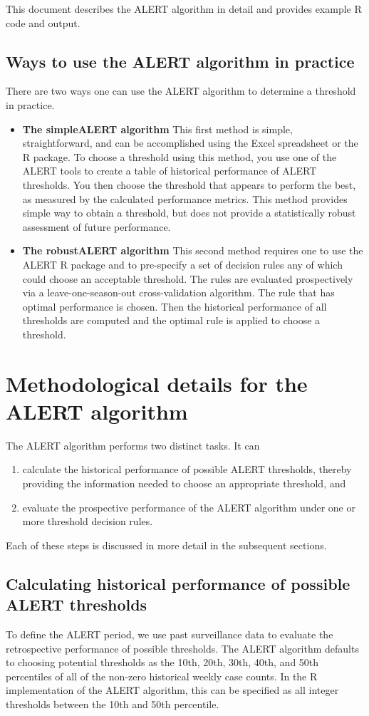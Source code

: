\documentclass[11pt]{article}\usepackage[]{graphicx}\usepackage[]{color}
\begin{document}
This document describes the ALERT algorithm in detail and provides example R code and output. 

\subsection*{Ways to use the ALERT algorithm in practice}
There are two ways one can use the ALERT algorithm to determine a threshold in practice. 

\begin{itemize}
\item {\bf The simpleALERT algorithm} This first method is simple, straightforward, and can be accomplished using the Excel spreadsheet or the R package. To choose a threshold using this method, you use one of the ALERT tools to create a table of historical performance of ALERT thresholds. You then choose the threshold that appears to perform the best, as measured by the calculated performance metrics. This method provides simple way to obtain a threshold, but does not provide a statistically robust assessment of future performance. 
\item {\bf The robustALERT algorithm} This second method requires one to use the ALERT R package and to pre-specify a set of decision rules any of which could choose an acceptable threshold. The rules are evaluated prospectively via a leave-one-season-out cross-validation algorithm. The rule that has optimal performance is chosen. Then the historical performance of all thresholds are computed and the optimal rule is applied to choose a threshold. 
\end{itemize}

\section{Methodological details for the ALERT algorithm}

The ALERT algorithm performs two distinct tasks. It can
\begin{enumerate}
\item calculate the historical performance of possible ALERT thresholds, thereby providing the information needed to choose an appropriate threshold, and
\item evaluate the prospective performance of the ALERT algorithm under one or more threshold decision rules.
\end{enumerate}
Each of these steps is discussed in more detail in the subsequent sections. 


\subsection*{Calculating historical performance of possible ALERT thresholds}
To define the ALERT period, we use past surveillance data to evaluate the retrospective performance of possible thresholds. The ALERT algorithm defaults to choosing potential thresholds as the 10th, 20th, 30th, 40th, and 50th percentiles of all of the non-zero historical weekly case counts. In the R implementation of the ALERT algorithm, this can be specified as all integer thresholds between the 10th and 50th percentile. 
\end{document}
